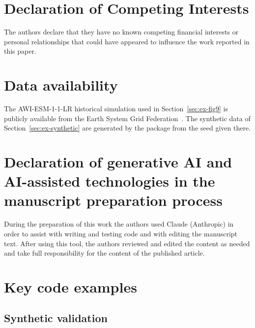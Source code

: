 \documentclass[preprint,12pt,a4paper]{elsarticle}
\newcommand{\revn}[1]{{#1}}
\begin{document}
\section*{\revn{Declaration of Competing Interests}}

\revn{The authors declare that they have no known competing financial
interests or personal relationships that could have appeared to
influence the work reported in this paper.}

\section*{Data availability}
The AWI-ESM-1-1-LR historical simulation used in
Section~\ref{sec:ex-fig9} is publicly available from the Earth
System Grid Federation~\cite{danek2020}. The synthetic data of
Section~\ref{sec:ex-synthetic} are generated by the package from the
seed given there.

\section*{Declaration of generative AI and AI-assisted technologies in the manuscript preparation process}
During the preparation of this work the authors used Claude
(Anthropic) in order to assist with writing and testing code and
with editing the manuscript text. After using this tool, the
authors reviewed and edited the content as needed and take full
responsibility for the content of the published article.

\appendix

\section{Key code examples}
\label{app:code}

\subsection{Synthetic validation}
\end{document}
